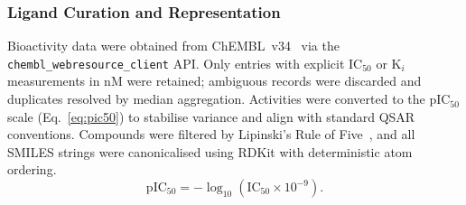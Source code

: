 \documentclass[conference]{IEEEtran}
\begin{document}
\begin{table}[!t]
\centering
\caption{Ten-target benchmark panel. Splits are 60/20/20
train/validation/test (\texttt{random\_state=42}).
Active threshold: pIC$_{50} \geq 6.0$.}
\label{tab:targets}
\end{table}

\subsubsection{Ligand Curation and Representation}
Bioactivity data were obtained from ChEMBL~v34~\cite{mendez2019chembl}
via the \texttt{chembl\_webresource\_client} API.
Only entries with explicit IC$_{50}$ or K$_i$ measurements in
nM were retained; ambiguous records were discarded and duplicates
resolved by median aggregation.
Activities were converted to the pIC$_{50}$ scale (Eq.~\ref{eq:pic50})
to stabilise variance and align with standard QSAR conventions.
Compounds were filtered by Lipinski's Rule of
Five~\cite{lipinski2004lead}, and all SMILES strings were
canonicalised using RDKit with deterministic atom ordering.
\begin{equation}
\label{eq:pic50}
\mathrm{pIC_{50}} = -\log_{10}(\mathrm{IC_{50}} \times 10^{-9}).
\end{equation}
\end{document}

